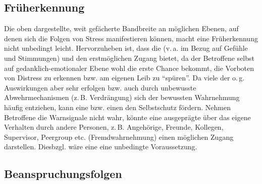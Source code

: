 \subsection{Früherkennung}
\label{topic:stressfrueherkennung-psi}

Die oben dargestellte, weit gefächerte Bandbreite an
möglichen Ebenen, auf denen sich die Folgen von Stress
manifestieren können, macht eine Früherkennung nicht
unbedingt leicht. Hervorzuheben ist, dass die  (v.\,a. im Bezug auf Gefühle und
Stimmungen) und  den erstmöglichen Zugang
bietet, da der Betroffene selbst auf gedanklich-emotionaler
Ebene wohl die erste Chance bekommt, die Vorboten von
Distress zu erkennen bzw. am eigenen Leib zu \enquote{spüren}. Da
viele der o.\,g. Auswirkungen aber sehr  erfolgen bzw. auch durch unbewusste
Abwehrmechanismen (z.\,B. Verdrängung) sich der bewussten
Wahrnehmung häufig entziehen, kann eine  bzw.  einen den
Selbstschutz fördern. Nehmen Betroffene die Warnsignale
nicht wahr, könnte eine ausgeprägte  über das eigene Verhalten durch andere Personen,
z.\,B. Angehörige, Freunde, Kollegen, Supervisor, Peergroup
etc. (Fremdwahrnehmung) einen möglichen Zugang darstellen.
Diesbzgl. wäre eine  eine
unbedingte Voraussetzung.


\subsection{Beanspruchungsfolgen}
\label{topic:beanspruchungsfolgen-psi}

